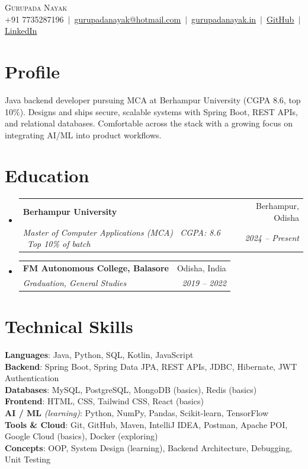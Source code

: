 \documentclass[letterpaper,11pt]{article}
\makeatletter
\newcommand{\resumeSubheading}[4]{
  \vspace{-2pt}\item
    \begin{tabular*}{0.97\textwidth}[t]{l@{\extracolsep{\fill}}r}
      \textbf{#1} & #2 \\
      \textit{\small#3} & \textit{\small #4} \\
    \end{tabular*}\vspace{-7pt}
}
\newcommand{\resumeSubHeadingListStart}{\begin{itemize}[leftmargin=0.15in, label={}]}
\newcommand{\resumeSubHeadingListEnd}{\end{itemize}}
\makeatother
\begin{document}
\begin{center}
    {\Huge \scshape Gurupada Nayak} \\ \vspace{4pt}
    \small
    +91 7735287196 $\,|\,$
    \href{mailto:gurupadanayak@hotmail.com}{\underline{gurupadanayak@hotmail.com}} $\,|\,$
    \href{https://gurupadanayak.in}{\underline{gurupadanayak.in}} $\,|\,$
    \href{https://github.com/Guru1817}{\underline{GitHub}} $\,|\,$
    \href{https://www.linkedin.com/in/gurupada-nayak-71724b25b/}{\underline{LinkedIn}}
\end{center}

\section{Profile}
\small{Java backend developer pursuing MCA at Berhampur University (CGPA 8.6, top 10\%). Designs and ships secure, scalable systems with Spring Boot, REST APIs, and relational databases. Comfortable across the stack with a growing focus on integrating AI/ML into product workflows.}

\section{Education}
\resumeSubHeadingListStart
  \resumeSubheading
    {Berhampur University}{Berhampur, Odisha}
    {Master of Computer Applications (MCA) \textbullet\ CGPA: 8.6 \textbullet\ Top 10\% of batch}{2024 -- Present}
  \resumeSubheading
    {FM Autonomous College, Balasore}{Odisha, India}
    {Graduation, General Studies}{2019 -- 2022}
\resumeSubHeadingListEnd

\section{Technical Skills}
\begin{itemize}[leftmargin=0.15in, label={}]
  \small{\item{
    \textbf{Languages}{: Java, Python, SQL, Kotlin, JavaScript} \\
    \textbf{Backend}{: Spring Boot, Spring Data JPA, REST APIs, JDBC, Hibernate, JWT Authentication} \\
    \textbf{Databases}{: MySQL, PostgreSQL, MongoDB (basics), Redis (basics)} \\
    \textbf{Frontend}{: HTML, CSS, Tailwind CSS, React (basics)} \\
    \textbf{AI / ML} \textit{(learning)}{: Python, NumPy, Pandas, Scikit-learn, TensorFlow} \\
    \textbf{Tools \& Cloud}{: Git, GitHub, Maven, IntelliJ IDEA, Postman, Apache POI, Google Cloud (basics), Docker (exploring)} \\
    \textbf{Concepts}{: OOP, System Design (learning), Backend Architecture, Debugging, Unit Testing}
  }}
\end{itemize}
\end{document}
